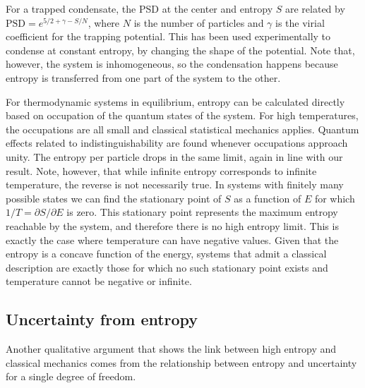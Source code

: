 \documentclass{article}
\begin{document}
For a trapped condensate, the PSD at the center and entropy $S$ are related by $\text{PSD}=e^{5/2+\gamma-S/N}$, where $N$ is the number of particles and $\gamma$ is the virial coefficient for the trapping potential.\cite{PhysRevLett.78.990} This has been used experimentally to condense at constant entropy, by changing the shape of the potential.\cite{PhysRevLett.81.2194} Note that, however, the system is inhomogeneous, so the condensation happens because entropy is transferred from one part of the system to the other.

For thermodynamic systems in equilibrium, entropy can be calculated directly based on occupation of the quantum states of the system. For high temperatures, the occupations are all small and classical statistical mechanics applies. Quantum effects related to indistinguishability are found whenever occupations approach unity. The entropy per particle drops in the same limit, again in line with our result. Note, however, that while infinite entropy corresponds to infinite temperature, the reverse is not necessarily true. In systems with finitely many possible states we can find the stationary point of $S$ as a function of $E$ for which $1/T=\partial S/\partial E$ is zero. This stationary point represents the maximum entropy reachable by the system, and therefore there is no high entropy limit. This is exactly the case where temperature can have negative values. Given that the entropy is a concave function of the energy, systems that admit a classical description are exactly those for which no such stationary point exists and temperature cannot be negative or infinite.%

\subsection{Uncertainty from entropy}

Another qualitative argument that shows the link between high entropy and classical mechanics comes from the relationship between entropy and uncertainty for a single degree of freedom.
\end{document}
